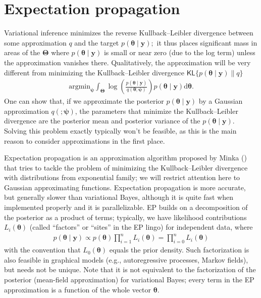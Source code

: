 \documentclass[
  11pt,
  letterpaper,
]{scrbook}
\theoremstyle{plain}
\theoremstyle{definition}
\theoremstyle{definition}
\theoremstyle{plain}
\theoremstyle{plain}
\theoremstyle{definition}
\theoremstyle{remark}
\begin{document}
\section{Expectation propagation}\label{expectation-propagation-1}

Variational inference minimizes the reverse Kullback--Leibler divergence
between some approximation \(q\) and the target
\(p(\boldsymbol{\theta} \mid \boldsymbol{y});\) it thus places
significant mass in areas of the \(\boldsymbol{\Theta}\) where
\(p(\boldsymbol{\theta} \mid \boldsymbol{y})\) is small or near zero
(due to the log term) unless the approximation vanishes there.
Qualitatively, the approximation will be very different from minimizing
the Kullback--Leibler divergence
\(\mathsf{KL}\{p(\boldsymbol{\theta} \mid \boldsymbol{y}) \parallel q\}\)
\begin{align*}
 \mathrm{argmin}_{\boldsymbol{\psi}}  \int_{\boldsymbol{\Theta}}\log \left(\frac{p(\boldsymbol{\theta} \mid \boldsymbol{y}) }{q(\boldsymbol{\theta}; \boldsymbol{\psi})}\right) p(\boldsymbol{\theta} \mid \boldsymbol{y}) \mathrm{d} \boldsymbol{\theta}.
\end{align*} One can show that, if we approximate the posterior
\(p(\boldsymbol{\theta} \mid \boldsymbol{y})\) by a Gaussian
approximation \(q(; \boldsymbol{\psi})\), the parameters that minimize
the Kullback--Leibler divergence are the posterior mean and posterior
variance of the \(p(\boldsymbol{\theta} \mid \boldsymbol{y}).\) Solving
this problem exactly typically won't be feasible, as this is the main
reason to consider approximations in the first place.

Expectation propagation is an approximation algorithm proposed by Minka
() that tries to tackle the problem of
minimizing the Kullback--Leibler divergence with distributions from
exponential family; we will restrict attention here to Gaussian
approximating functions. Expectation propagation is more accurate, but
generally slower than variational Bayes, although it is quite fast when
implemented properly and it is parallelizable. EP builds on a
decomposition of the posterior as a product of terms; typically, we have
likelihood contributions \(L_i(\boldsymbol{\theta})\) (called
``factors'' or ``sites'' in the EP lingo) for independent data, where
\begin{align*}
 p(\boldsymbol{\theta} \mid \boldsymbol{y}) \propto p(\boldsymbol{\theta}) \prod_{i=1}^n L_i(\boldsymbol{\theta}) = \prod_{i=0}^n L_i(\boldsymbol{\theta})
\end{align*} with the convention that \(L_0(\boldsymbol{\theta})\)
equals the prior density. Such factorization is also feasible in
graphical models (e.g., autoregressive processes, Markov fields), but
needs not be unique. Note that it is not equivalent to the factorization
of the posterior (mean-field approximation) for variational Bayes; every
term in the EP approximation is a function of the whole vector
\(\boldsymbol{\theta}.\)
\end{document}
